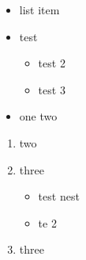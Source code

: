 \documentclass{article}
\begin{document}
\begin{itemize}
\item list item
\item test
\begin{itemize}
\item test 2
\item test 3
\end{itemize}
\item one two
\end{itemize}
\begin{enumerate}
\item two
\item three
\begin{itemize}
\item test nest
\item te 2
\end{itemize}
\item three
\end{enumerate}
\end{document}
